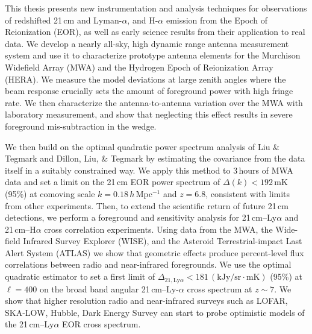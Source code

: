 % 
% 
%

This thesis presents new instrumentation and analysis techniques for observations of redshifted 21\,cm and Lyman-$\alpha$, and H-$\alpha$  emission from the Epoch of Reionization (EOR), as well as early science results from their application to real data. We develop a nearly all-sky, high dynamic range antenna measurement system and use it to characterize prototype antenna elements for the Murchison Widefield Array (MWA) and the Hydrogen Epoch of Reionization Array (HERA). We measure the model deviations at large zenith angles where the beam response crucially sets the amount of foreground power with high fringe rate. We then characterize the antenna-to-antenna variation over the MWA with laboratory measurement, and show that neglecting this effect results in severe foreground mis-subtraction in the wedge.

We then build on the optimal quadratic power spectrum analysis of Liu \& Tegmark and Dillon, Liu, \& Tegmark by estimating the covariance from the data itself in a suitably constrained way. We apply this method to 3\,hours of MWA data and set a limit on the 21\,cm EOR power spectrum of $\Delta(k) < 192$\,mK (95\%) at comoving scale $k = 0.18$\,$h$\,Mpc$^{-1}$ and $z = 6.8$, consistent with limits from other experiments. Then, to extend the scientific return of future 21\,cm detections, we perform a foreground and sensitivity analysis for 21\,cm--Ly$\alpha$ and 21\,cm--H$\alpha$ cross correlation experiments. Using data from the MWA, the Wide-field Infrared Survey Explorer (WISE), and the Asteroid Terrestrial-impact Last Alert System (ATLAS) we show that geometric effects produce percent-level flux correlations between radio and near-infrared foregrounds. We use the optimal quadratic estimator to set a first limit of $\Delta_{21,\text{Ly}\alpha}<181\,(\text{kJy/sr}\cdot \text{mK})$ (95\%) at $\ell=400$ on the broad band angular 21\,cm--Ly-$\alpha$ cross spectrum at $z\sim7$. We show that higher resolution radio and near-infrared surveys such as LOFAR, SKA-LOW, Hubble, Dark Energy Survey can start to probe optimistic models of the 21\,cm--Ly$\alpha$ EOR cross spectrum.

